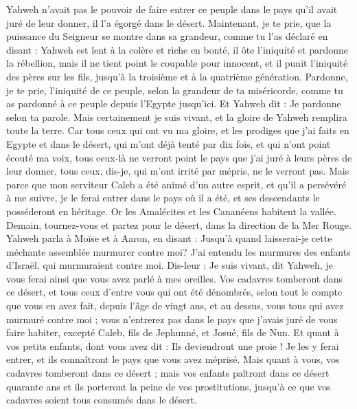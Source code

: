 \begin{multicols}{2}
Yahweh n'avait pas le pouvoir de faire entrer ce peuple dans le pays qu'il avait juré de leur donner, il l'a égorgé dans le désert.
Maintenant, je te prie, que la puissance du Seigneur se montre dans sa grandeur, comme tu l'as déclaré en disant :
Yahweh est lent à la colère et riche en bonté, il ôte l'iniquité et pardonne la rébellion, mais il ne tient point le coupable pour innocent, et il punit l'iniquité des pères sur les fils, jusqu'à la troisième et à la quatrième génération.
Pardonne, je te prie, l'iniquité de ce peuple, selon la grandeur de ta miséricorde, comme tu as pardonné à ce peuple depuis l'Egypte jusqu'ici.
Et Yahweh dit : Je pardonne selon ta parole.
Mais certainement je suis vivant, et la gloire de Yahweh remplira toute la terre.
Car tous ceux qui ont vu ma gloire, et les prodiges que j'ai faits en Egypte et dans le désert, qui m'ont déjà tenté par dix fois, et qui n'ont point écouté ma voix,
tous ceux-là ne verront point le pays que j'ai juré à leurs pères de leur donner, tous ceux, dis-je, qui m'ont irrité par mépris, ne le verront pas.
Mais parce que mon serviteur Caleb a été animé d'un autre esprit, et qu'il a persévéré à me suivre, je le ferai entrer dans le pays où il a été, et ses descendants le posséderont en héritage.
Or les Amalécites et les Cananéens habitent la vallée. Demain, tournez-vous et partez pour le désert, dans la direction de la Mer Rouge.
Yahweh parla à Moïse et à Aaron, en disant :
Jusqu'à quand laisserai-je cette méchante assemblée murmurer contre moi? J'ai entendu les murmures des enfants d'Israël, qui murmuraient contre moi.
Dis-leur : Je suis vivant, dit Yahweh, je vous ferai ainsi que vous avez parlé à mes oreilles.
Vos cadavres tomberont dans ce désert, et tous ceux d'entre vous qui ont été dénombrés, selon tout le compte que vous en avez fait, depuis l'âge de vingt ans, et au dessus, vous tous qui avez murmuré contre moi ;
vous n'entrerez pas dans le pays que j'avais juré de vous faire habiter, excepté Caleb, fils de Jephunné, et Josué, fils de Nun.
Et quant à vos petits enfants, dont vous avez dit : Ils deviendront une proie ! Je les y ferai entrer, et ils connaîtront le pays que vous avez méprisé.
Mais quant à vous, vos cadavres tomberont dans ce désert ;
mais vos enfants paîtront dans ce désert quarante ans et ils porteront la peine de vos prostitutions, jusqu'à ce que vos cadavres soient tous consumés dans le désert.

\end{multicols}
